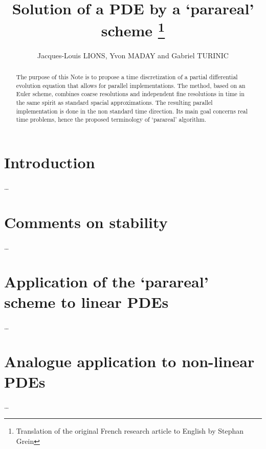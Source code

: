 \documentclass[12pt]{article}
\title{Solution of a PDE by a `parareal' scheme \footnote{Translation of the original French research article \cite{Lions2001} to English by Stephan Grein}}
\author{Jacques-Louis LIONS, Yvon MADAY and Gabriel TURINIC}
\begin{document}
\maketitle

\begin{abstract}
The purpose of this Note is to propose a time discretization of a partial differential evolution
equation that allows for parallel implementations. The method, based on an Euler scheme,
combines coarse resolutions and independent fine resolutions in time in the same spirit
as standard spacial approximations. The resulting parallel implementation is done in the
non standard time direction. Its main goal concerns real time problems, hence the proposed
terminology of `parareal' algorithm.
\end{abstract}

\tableofcontents
\newpage

\section{Introduction}
\dots
\section{Comments on stability}
\dots
\section{Application of the `parareal' scheme to linear PDEs}
\dots
\section{Analogue application to non-linear PDEs}
\dots




\end{document}
